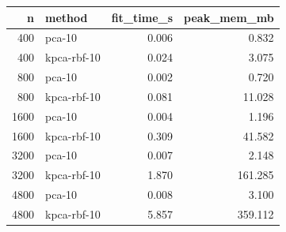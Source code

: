 \begin{tabular}{rlrr}
\toprule
n & method & fit_time_s & peak_mem_mb \\
\midrule
400 & pca-10 & 0.006 & 0.832 \\
400 & kpca-rbf-10 & 0.024 & 3.075 \\
800 & pca-10 & 0.002 & 0.720 \\
800 & kpca-rbf-10 & 0.081 & 11.028 \\
1600 & pca-10 & 0.004 & 1.196 \\
1600 & kpca-rbf-10 & 0.309 & 41.582 \\
3200 & pca-10 & 0.007 & 2.148 \\
3200 & kpca-rbf-10 & 1.870 & 161.285 \\
4800 & pca-10 & 0.008 & 3.100 \\
4800 & kpca-rbf-10 & 5.857 & 359.112 \\
\bottomrule
\end{tabular}

